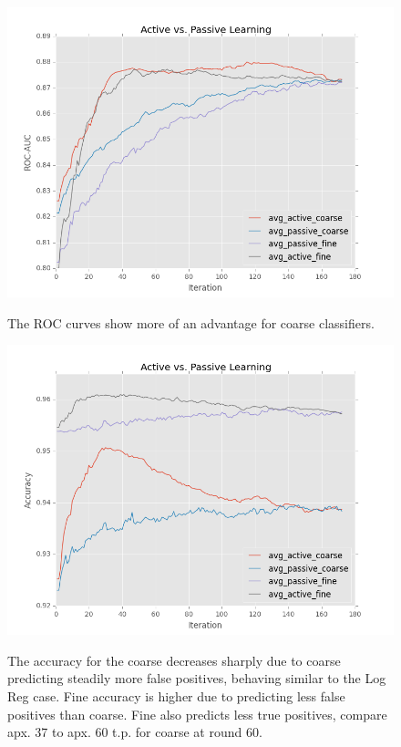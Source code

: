 \documentclass[ms]{nuthesis}
\begin{document}
\FloatBarrier
\begin{figure}[!htb]
	\centering
    \includegraphics[width=1.0\columnwidth]{fig/ActiveVsPassiveROCSVM}
    \label{fig:ActiveVsPassiveROCSVM}
    \caption{The ROC curves show more of an advantage for coarse classifiers.}
\end{figure}
\FloatBarrier


\FloatBarrier
\begin{figure}[!htb]
	\centering
    \includegraphics[width=1.0\columnwidth]{fig/ActiveVsPassiveAccSVM}
    \label{fig:ActiveVsPassiveAccSVM}
    \caption{The accuracy for the coarse decreases sharply due
to coarse predicting steadily more false positives, behaving similar to the
Log Reg case. Fine accuracy is higher due to predicting less false positives
than coarse. Fine also predicts less true positives, compare apx. 37 to apx.
60 t.p. for coarse at round 60.}
\end{figure}
\FloatBarrier
\end{document}
